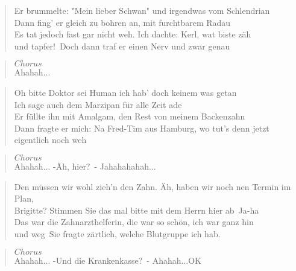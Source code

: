 \documentclass[9pt,a4paper,oneside, onecolumn]{article}
\begin{document}
\begin{verse}
Er \Em{}brummelte: "Mein lieber Schwan" und irgendwas vom Schlendrian\\
Dann \D{}fing' er gleich zu bohren an, mit \Em{}furchtbarem Radau\\
Es \Em{}tat jedoch fast gar nicht weh. Ich dachte: \glqq Kerl, wat biste zäh\\ und \D{}tapfer!\grqq\
Doch dann traf er einen  \Em{}Nerv und zwar genau\\
\end{verse}

\begin{verse}
$Chorus$\\
\quad{}Ahahah...
\end{verse}

\begin{verse}
Oh \Em{}bitte Doktor sei Human ich hab' doch keinem was getan\\
Ich \D{}sage auch dem Marzipan für \Em{}alle Zeit ade\\
Er \Em{}füllte ihn mit Amalgam, den Rest von meinem Backenzahn\\
Dann \D{}fragte er mich: \glqq Na Fred-Tim aus \Em{}Hamburg, wo tut's denn jetzt eigentlich noch weh\grqq\\
\end{verse}

\begin{verse}
$Chorus$\\
\Em{}Aha\Em{}hah\D{}... \Em{}-\glqq Äh, hier?\grqq\ - \Em{}Jaha\D{}hah\Em{}ahah\Em{}...
\end{verse}

\begin{verse}
\glqq Den \Em{}müssen wir wohl zieh'n den Zahn. Äh, haben wir noch nen Termin im Plan,\\ Bri\D{}gitte?
Stimmen Sie das mal bitte \Em{}mit dem Herrn hier ab\grqq\ \glqq Ja-ha\grqq\\
\glqq Das \Em{}war die Zahnarzthelferin, die war so schön, ich war ganz hin\\ und \D{}weg\grqq\
Sie fragte zärtlich, welche \Em{}Blutgruppe ich hab.\\
\end{verse}

\begin{verse}
$Chorus$\\
\Em{}Aha\Em{}hah\D{}... \Em{}-\glqq Und die Krankenkasse?\grqq\ - \Em{}Aha\D{}hah\Em{}...O\Em{}K
\end{verse}
\end{document}

